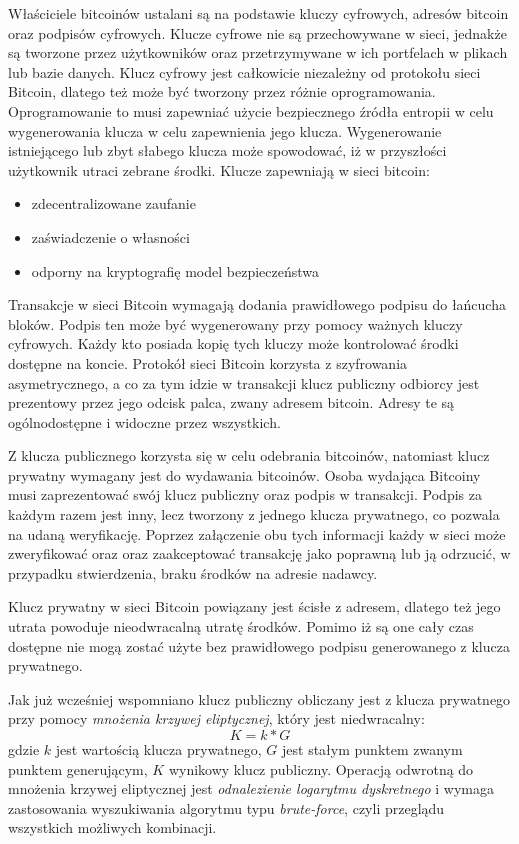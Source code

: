 \documentclass[printmode,oneside]{mgr}
\begin{document}
\indent Właściciele bitcoinów ustalani są na podstawie kluczy cyfrowych, adresów bitcoin oraz podpisów cyfrowych. Klucze cyfrowe nie są przechowywane w sieci, jednakże są tworzone przez użytkowników oraz przetrzymywane w ich portfelach w plikach lub bazie danych. Klucz cyfrowy jest całkowicie niezależny od protokołu sieci Bitcoin, dlatego też może być tworzony przez różnie oprogramowania. Oprogramowanie to musi zapewniać użycie bezpiecznego źródła entropii w celu wygenerowania klucza w celu zapewnienia jego klucza. Wygenerowanie istniejącego lub zbyt słabego klucza może spowodować, iż w przyszłości użytkownik utraci zebrane środki. Klucze zapewniają w sieci bitcoin:
\begin{itemize}
\item zdecentralizowane zaufanie
\item zaświadczenie o własności
\item odporny na kryptografię model bezpieczeństwa
\end{itemize}
Transakcje w sieci Bitcoin wymagają dodania prawidłowego podpisu do łańcucha bloków. Podpis ten może być wygenerowany przy pomocy ważnych kluczy cyfrowych. Każdy kto posiada kopię tych kluczy może kontrolować środki dostępne na koncie. Protokół sieci Bitcoin korzysta z szyfrowania asymetrycznego, a co za tym idzie w transakcji klucz publiczny odbiorcy jest prezentowy przez jego odcisk palca, zwany adresem bitcoin. Adresy te są ogólnodostępne i widoczne przez wszystkich. 

\indent Z klucza publicznego korzysta się w celu odebrania bitcoinów, natomiast klucz prywatny wymagany jest do wydawania bitcoinów. Osoba wydająca Bitcoiny musi zaprezentować swój klucz publiczny oraz podpis w transakcji. Podpis za każdym razem jest inny, lecz tworzony z jednego klucza prywatnego, co pozwala na udaną weryfikację. Poprzez załączenie obu tych informacji każdy w sieci może zweryfikować oraz oraz zaakceptować transakcję jako poprawną lub ją odrzucić, w przypadku stwierdzenia, braku środków na adresie nadawcy. 

\indent Klucz prywatny w sieci Bitcoin powiązany jest ścisłe z adresem, dlatego też jego utrata powoduje nieodwracalną utratę środków. Pomimo iż są one cały czas dostępne nie mogą zostać użyte bez prawidłowego podpisu generowanego z klucza prywatnego.

\indent Jak już wcześniej wspomniano klucz publiczny obliczany jest z klucza prywatnego przy pomocy  \textit{mnożenia krzywej eliptycznej}, który jest niedwracalny: $$K=k*G$$ gdzie $k$ jest wartością klucza prywatnego, $G$ jest stałym punktem zwanym punktem generującym, $K$ wynikowy klucz publiczny. Operacją odwrotną do mnożenia krzywej eliptycznej jest \textit{odnalezienie logarytmu dyskretnego} i wymaga zastosowania wyszukiwania algorytmu typu \textit{brute-force}, czyli przeglądu wszystkich możliwych kombinacji.  
\end{document}
